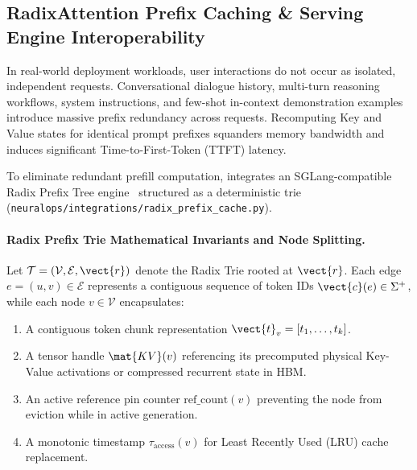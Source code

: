 \subsection{RadixAttention Prefix Caching \& Serving Engine Interoperability}
\label{sec:serving_speculative_decoding}
\label{sec:serving_radix_prefix_cache}

In real-world deployment workloads, user interactions do not occur as isolated, independent requests. Conversational dialogue history, multi-turn reasoning workflows, system instructions, and few-shot in-context demonstration examples introduce massive prefix redundancy across requests. Recomputing Key and Value states for identical prompt prefixes squanders memory bandwidth and induces significant Time-to-First-Token (TTFT) latency.

To eliminate redundant prefill computation, \neuralops{} integrates an SGLang-compatible Radix Prefix Tree engine~\cite{zheng2024sglang} structured as a deterministic trie (\texttt{neuralops/integrations/radix\_prefix\_cache.py}).

\paragraph{Radix Prefix Trie Mathematical Invariants and Node Splitting.}
Let $\mathcal{T} = (\mathcal{V}, \mathcal{E}, \vect{r})$ denote the Radix Trie rooted at $\vect{r}$. Each edge $e = (u, v) \in \mathcal{E}$ represents a contiguous sequence of token IDs $\vect{c}(e) \in \Sigma^+$, while each node $v \in \mathcal{V}$ encapsulates:
\begin{enumerate}
    \item A contiguous token chunk representation $\vect{t}_v = [t_1, \dots, t_k]$.
    \item A tensor handle $\mat{KV}(v)$ referencing its precomputed physical Key-Value activations or compressed recurrent state in HBM.
    \item An active reference pin counter $\text{ref\_count}(v)$ preventing the node from eviction while in active generation.
    \item A monotonic timestamp $\tau_{\text{access}}(v)$ for Least Recently Used (LRU) cache replacement.
\end{enumerate}


